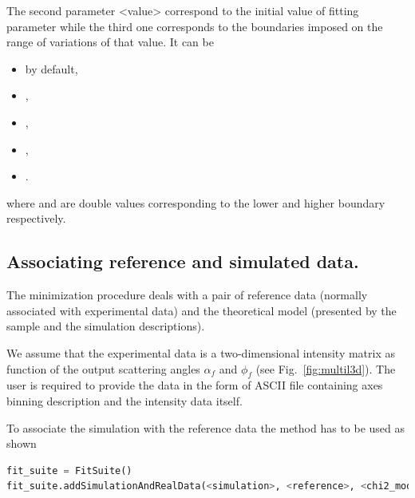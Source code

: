 The second parameter \Code <value> correspond to the initial value of fitting parameter
while the third one  corresponds to
the boundaries imposed on the range of variations of that value. It can be
\begin{itemize}
\item {} by default, 
\item {}, 
\item {}, 
\item {}, 
\item {}.
\end{itemize}
where  and  are
double values corresponding to the lower and higher boundary respectively.


%
\subsection{Associating reference and simulated data.}

The minimization procedure deals with a pair of reference data (normally
associated with experimental data) and the theoretical model (presented by the sample and the simulation descriptions).

We assume that the experimental data is a two-dimensional intensity 
matrix as function of the output scattering
angles $\alpha_f$ and $\phi_f$ (see Fig.~\ref{fig:multil3d}).
The user is required to provide the data in the form of ASCII file containing axes
binning description and the intensity data itself. 
\vspace*{2mm}

\vspace*{1mm}

To associate the simulation with the reference data the method \newline
{} has to be used as shown
\begin{lstlisting}[language=python, style=eclipseboxed,numbers=none]
fit_suite = FitSuite()
fit_suite.addSimulationAndRealData(<simulation>, <reference>, <chi2_module>)
\end{lstlisting}

